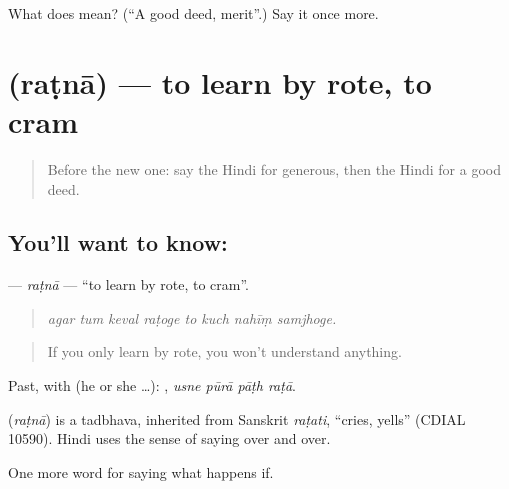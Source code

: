 \begin{tcolorbox}[breakable,colback=teal!4,colframe=teal!35!black,title={Before you move on}]
What does  mean? (\textquotedblleft{}A good deed, merit\textquotedblright{}.) Say it once more.
\end{tcolorbox}
\section[\texorpdfstring{\hi{रटना} (raṭnā)}{रटना (raṭnā)}]{ (raṭnā) — to learn by rote, to cram}

\label{lesson:HI-C396-ratna}



\begin{quote}
Before the new one: say the Hindi for generous, then the Hindi for a good deed.
\end{quote}

\subsection*{You'll want to know: }
\textbf{} — \emph{raṭnā} — \textquotedblleft{}to learn by rote, to cram\textquotedblright{}.

\begin{quote}
       
\end{quote}

\begin{quote}
\emph{agar tum keval raṭoge to kuch nahīṃ samjhoge.}
\end{quote}

\begin{quote}
If you only learn by rote, you won't understand anything.
\end{quote}

Past, with  (he or she …):    , \emph{usne pūrā pāṭh raṭā}.

\begin{cousinweb}
\textbf{} (\emph{raṭnā}) is a tadbhava, inherited from Sanskrit \emph{raṭati}, \textquotedblleft{}cries, yells\textquotedblright{} (CDIAL 10590). Hindi uses the sense of saying over and over.
\end{cousinweb}

\begin{grammarlens}[title={What you've built}]
One more word for saying what happens if.
\end{grammarlens}


